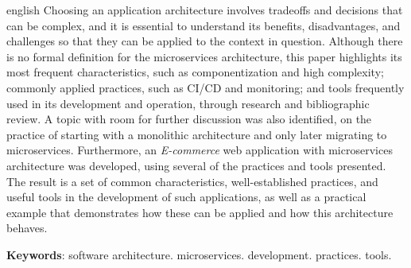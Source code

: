 \setlength{\absparsep}{18pt} %
\begin{resumo}[Abstract]
 \begin{otherlanguage*}{english}
   Choosing an application architecture involves tradeoffs and decisions that can be complex, and it is essential to understand its benefits, disadvantages, and challenges so that they can be applied to the context in question. Although there is no formal definition for the microservices architecture, this paper highlights its most frequent characteristics, such as componentization and high complexity; commonly applied practices, such as CI/CD and monitoring; and tools frequently used in its development and operation, through research and bibliographic review. A topic with room for further discussion was also identified, on the practice of starting with a monolithic architecture and only later migrating to microservices. Furthermore, an \emph{E-commerce} web application with microservices architecture was developed, using several of the practices and tools presented. The result is a set of common characteristics, well-established practices, and useful tools in the development of such applications, as well as a practical example that demonstrates how these can be applied and how this architecture behaves.
   

   \vspace{\onelineskip}
 
   \noindent 
   \textbf{Keywords}: software architecture. microservices. development. practices. tools.
 \end{otherlanguage*}
\end{resumo}